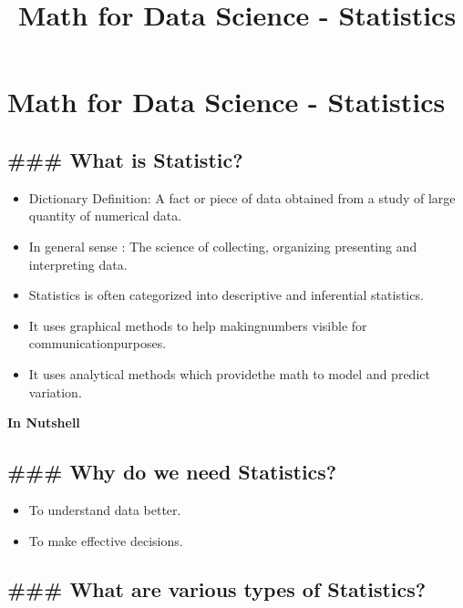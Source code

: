 \documentclass[11pt]{article}
\title{Math for Data Science - Statistics}
\providecommand{\tightlist}{%
      \setlength{\itemsep}{0pt}\setlength{\parskip}{0pt}}
\begin{document}
    
    
    \maketitle
    
    

    
    \section{Math for Data Science -
Statistics}\label{math-for-data-science---statistics}

    \subsection{\#\#\# What is Statistic?}\label{what-is-statistic}

    \begin{itemize}
\tightlist
\item
  Dictionary Definition: A fact or piece of data obtained from a study
  of large quantity of numerical data.
\item
  In general sense : The science of collecting, organizing presenting
  and interpreting data.
\item
  Statistics is often categorized into descriptive and inferential
  statistics.
\item
  It uses graphical methods to help makingnumbers visible for
  communicationpurposes.
\item
  It uses analytical methods which providethe math to model and predict
  variation.
\end{itemize}

\textbf{In Nutshell}

    \subsection{\#\#\# Why do we need
Statistics?}\label{why-do-we-need-statistics}

    \begin{itemize}
\tightlist
\item
  To understand data better.
\item
  To make effective decisions.
\end{itemize}

    \subsection{\#\#\# What are various types of
Statistics?}\label{what-are-various-types-of-statistics}
\end{document}

